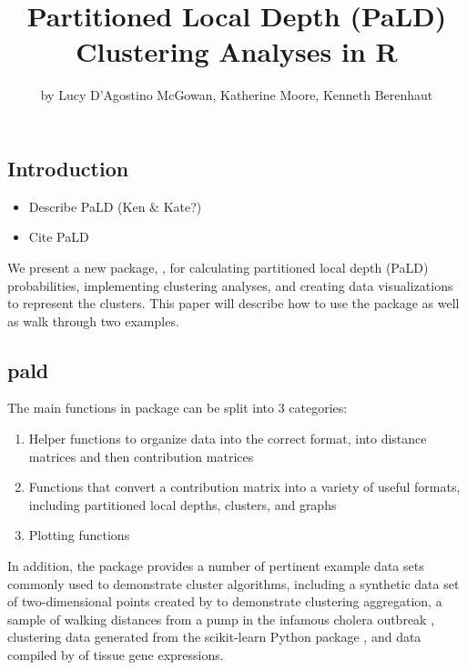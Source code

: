 \title{Partitioned Local Depth (PaLD) Clustering Analyses in R}
\author{by Lucy D'Agostino McGowan, Katherine Moore, Kenneth Berenhaut}

\maketitle



\hypertarget{introduction}{%
\subsection{Introduction}\label{introduction}}

\begin{itemize}
\tightlist
\item
  Describe PaLD (Ken \& Kate?)
\item
  Cite PaLD
\end{itemize}

We present a new package, , for calculating partitioned
local depth (PaLD) probabilities, implementing clustering analyses, and
creating data visualizations to represent the clusters. This paper will
describe how to use the package as well as walk through two examples.

\hypertarget{pald}{%
\subsection{pald}\label{pald}}

The main functions in  package can be split into 3
categories:

\begin{enumerate}
\def\labelenumi{\arabic{enumi}.}
\tightlist
\item
  Helper functions to organize data into the correct format, into
  distance matrices and then contribution matrices
\item
  Functions that convert a contribution matrix into a variety of useful
  formats, including partitioned local depths, clusters, and graphs
\item
  Plotting functions
\end{enumerate}

In addition, the package provides a number of pertinent example data
sets commonly used to demonstrate cluster algorithms, including a
synthetic data set of two-dimensional points created by
\citet{gionis1clustering} to demonstrate clustering aggregation, a
sample of walking distances from a pump in the infamous cholera outbreak
\citep{cholera}, clustering data generated from the scikit-learn Python
package \citep{pedregosa2011scikit}, and data compiled by \cite{tissue}
of tissue gene expressions.

